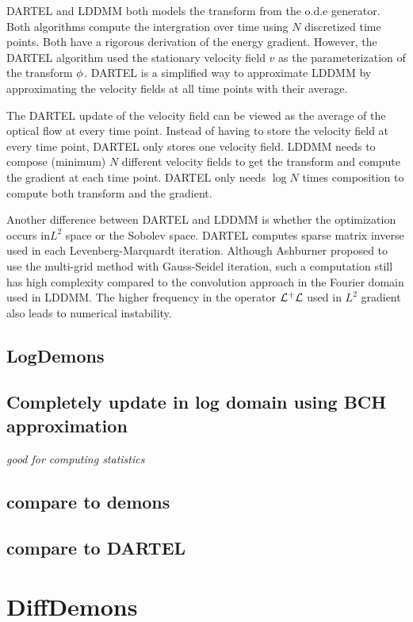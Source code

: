 \documentclass[letterpaper,12pt]{article}
\begin{document}
DARTEL and LDDMM both models the transform from the o.d.e generator. Both algorithms compute the intergration over time using $N$ discretized time points. Both have a rigorous derivation of the energy gradient. 
However, the DARTEL algorithm used the stationary velocity field $v$
as the parameterization of the transform $\phi$. DARTEL is a simplified way to approximate LDDMM by approximating the velocity fields at all time points with their average.

The DARTEL update of the velocity field can be viewed as the average
of the optical flow at every time point. Instead of having to store
the velocity field at every time point, DARTEL only stores one
velocity field. LDDMM needs to compose (minimum) $N$ different velocity fields to get the transform and compute the gradient at each time point. DARTEL only needs $\log N$ times composition to compute both transform and the gradient. 

Another difference between DARTEL and LDDMM is whether the
optimization occurs in$L^2$ space or the Sobolev space. DARTEL
computes sparse matrix inverse used in each Levenberg-Marquardt
iteration. Although Ashburner proposed to use the multi-grid method with
Gauss-Seidel iteration, such a computation still has high complexity compared to the convolution approach in the Fourier domain used in LDDMM. The higher frequency in the operator $\mathcal{L}^+\mathcal{L}$ used in $L^2$ gradient also leads to numerical instability.


\subsection{LogDemons}



\subsection{Completely update in log domain using BCH approximation}
\textit{good for computing statistics}
\subsection{compare to demons}
\subsection{compare to DARTEL}


\section{DiffDemons}
\end{document}
